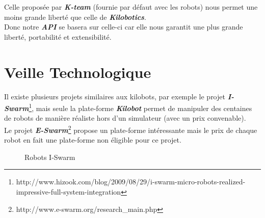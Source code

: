 \documentclass[a4paper,8pt]{report}
\begin{document}
\medskip
Celle propos\'ee par \textit{\textbf{K-team}} (fournie par d\'efaut avec les robots) nous permet une moins grande libert\'e que celle de \textit{\textbf{Kilobotics}}.\\
Donc notre \textit{\textbf{API}} se basera sur celle-ci car elle nous garantit une plus grande libert\'e, portabilit\'e et extensibilit\'e.

\section*{Veille Technologique}\label{sec:name}

Il existe plusieurs projets similaires aux kilobots, par exemple le projet \textit{\textbf{I-Swarm}}\footnote{http://www.hizook.com/blog/2009/08/29/i-swarm-micro-robots-realized-impressive-full-system-integration}, mais seule la plate-forme \textit{\textbf{Kilobot}} permet de manipuler des centaines de robots de mani\`ere r\'ealiste hors d'un simulateur (avec un prix convenable).\\
Le projet \textit{\textbf{E-Swarm}}\footnote{http://www.e-swarm.org/research_main.php} propose un plate-forme int\'eressante mais le prix de chaque robot en fait une plate-forme non \'eligible pour ce projet.\\

\begin{figure}[!h]
    \centering
    \caption{Robots I-Swarm}
    \label{pandas}
\end{figure}
\end{document}

